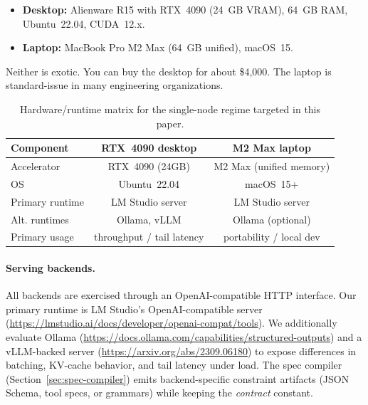 \documentclass[11pt]{article}
\begin{document}
\begin{itemize}[leftmargin=12pt]
    \item \textbf{Desktop:} Alienware R15 with RTX~4090 (24~GB VRAM), 64~GB RAM, Ubuntu~22.04, CUDA~12.x.
    \item \textbf{Laptop:} MacBook Pro M2 Max (64~GB unified), macOS~15.
\end{itemize}

Neither is exotic.
You can buy the desktop for about \$4,000.
The laptop is standard-issue in many engineering organizations.

\begin{table}[t]
\centering
\small
\begin{tabular}{@{}lcc@{}}
\toprule
\textbf{Component} & \textbf{RTX~4090 desktop} & \textbf{M2 Max laptop} \\
\midrule
Accelerator & RTX~4090 (24GB) & M2 Max (unified memory) \\
OS & Ubuntu~22.04 & macOS~15+ \\
Primary runtime & LM Studio server & LM Studio server \\
Alt. runtimes & Ollama, vLLM & Ollama (optional) \\
Primary usage & throughput / tail latency & portability / local dev \\
\bottomrule
\end{tabular}
\caption{Hardware/runtime matrix for the single-node regime targeted in this paper.}
\label{tab:hw-matrix}
\end{table}

\paragraph{Serving backends.}
All backends are exercised through an OpenAI-compatible HTTP interface.
Our primary runtime is LM Studio’s OpenAI-compatible server (\url{https://lmstudio.ai/docs/developer/openai-compat/tools}).
We additionally evaluate Ollama (\url{https://docs.ollama.com/capabilities/structured-outputs}) and a vLLM-backed server (\url{https://arxiv.org/abs/2309.06180}) to expose differences in batching, KV-cache behavior, and tail latency under load.
The spec compiler (Section~\ref{sec:spec-compiler}) emits backend-specific constraint artifacts (JSON Schema, tool specs, or grammars) while keeping the \emph{contract} constant.
\end{document}
